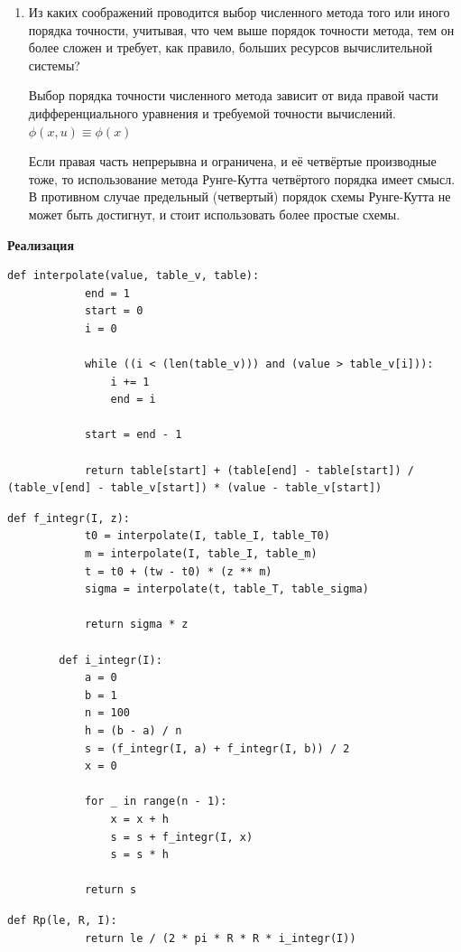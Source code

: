 \documentclass[14pt, a4paper]{extarticle}
\begin{document}
\begin{enumerate}
		\item Из каких соображений проводится выбор численного метода того или
		иного порядка точности, учитывая, что чем выше порядок точности метода, тем он более сложен и требует, как правило, больших ресурсов вычислительной системы?\par
		Выбор порядка точности численного метода зависит от вида правой части дифференциального уравнения и требуемой точности вычислений.
		$\phi(x, u) \equiv \phi(x)$ \par
		Если правая часть непрерывна и ограничена, и её четвёртые производные тоже, то использование метода Рунге-Кутта четвёртого порядка имеет смысл. В противном случае предельный (четвертый) порядок схемы Рунге-Кутта не может быть достигнут, и стоит использовать более простые схемы.
  

		
		
		
	\end{enumerate}
	
	\newpage
	\textbf{Реализация}
	
	\begin{lstlisting}[caption=Интерполяция]
		def interpolate(value, table_v, table):
			end = 1
			start = 0
			i = 0
			
			while ((i < (len(table_v))) and (value > table_v[i])):
				i += 1
				end = i
			
			start = end - 1
			
			return table[start] + (table[end] - table[start]) / (table_v[end] - table_v[start]) * (value - table_v[start])
	\end{lstlisting}

	\begin{lstlisting}[caption=Интегрирование]
		def f_integr(I, z):
			t0 = interpolate(I, table_I, table_T0)
			m = interpolate(I, table_I, table_m)
			t = t0 + (tw - t0) * (z ** m)
			sigma = interpolate(t, table_T, table_sigma)
			
			return sigma * z
		
		def i_integr(I):
			a = 0
			b = 1
			n = 100
			h = (b - a) / n
			s = (f_integr(I, a) + f_integr(I, b)) / 2
			x = 0
			
			for _ in range(n - 1):
				x = x + h
				s = s + f_integr(I, x)
				s = s * h
			
			return s
	\end{lstlisting}

	\begin{lstlisting}[caption=Вычисление сопротивления Rp]
		def Rp(le, R, I):
			return le / (2 * pi * R * R * i_integr(I))
	\end{lstlisting}
\end{document}
